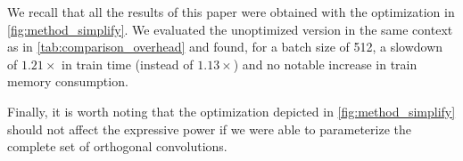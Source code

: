     We recall that all the results of this paper were obtained with the optimization in \cref{fig:method_simplify}. We evaluated the unoptimized version in the same context as in \cref{tab:comparison_overhead} and found, for a batch size of 512, a slowdown of $1.21 \times $ in train time (instead of $1.13\times$) and no notable increase in train memory consumption.

    Finally, it is worth noting that the optimization depicted in \cref{fig:method_simplify} should not affect the expressive power if we were able to parameterize the complete set of orthogonal convolutions.